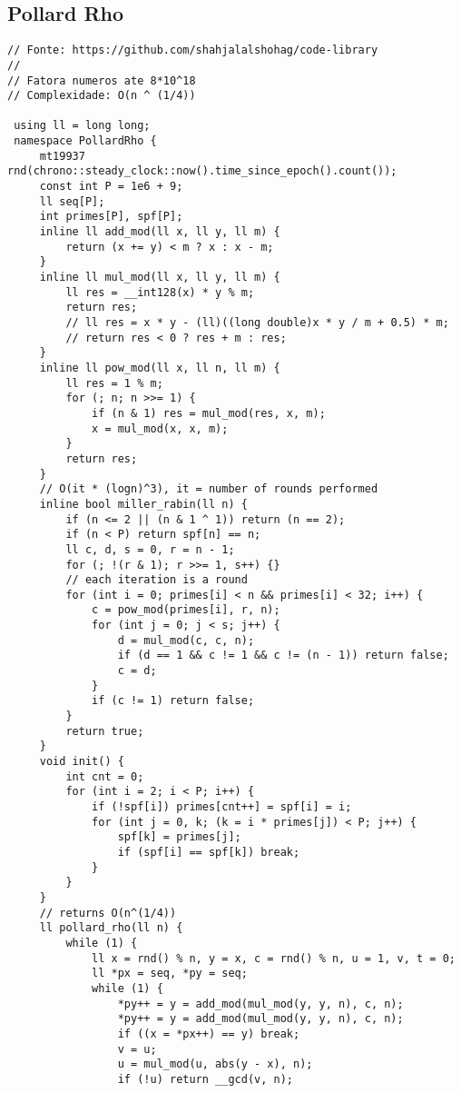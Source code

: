 \documentclass[11pt, a4paper, twoside]{article}
\begin{document}
\subsection{Pollard Rho}
\begin{lstlisting}
// Fonte: https://github.com/shahjalalshohag/code-library
// 
// Fatora numeros ate 8*10^18 
// Complexidade: O(n ^ (1/4))

 using ll = long long;
 namespace PollardRho {
     mt19937 rnd(chrono::steady_clock::now().time_since_epoch().count());
     const int P = 1e6 + 9;
     ll seq[P];
     int primes[P], spf[P];
     inline ll add_mod(ll x, ll y, ll m) {
         return (x += y) < m ? x : x - m;
     }
     inline ll mul_mod(ll x, ll y, ll m) {
         ll res = __int128(x) * y % m;
         return res;
         // ll res = x * y - (ll)((long double)x * y / m + 0.5) * m;
         // return res < 0 ? res + m : res;
     }
     inline ll pow_mod(ll x, ll n, ll m) {
         ll res = 1 % m;
         for (; n; n >>= 1) {
             if (n & 1) res = mul_mod(res, x, m);
             x = mul_mod(x, x, m);
         }
         return res;
     }
     // O(it * (logn)^3), it = number of rounds performed
     inline bool miller_rabin(ll n) {
         if (n <= 2 || (n & 1 ^ 1)) return (n == 2);
         if (n < P) return spf[n] == n;
         ll c, d, s = 0, r = n - 1;
         for (; !(r & 1); r >>= 1, s++) {}
         // each iteration is a round
         for (int i = 0; primes[i] < n && primes[i] < 32; i++) {
             c = pow_mod(primes[i], r, n);
             for (int j = 0; j < s; j++) {
                 d = mul_mod(c, c, n);
                 if (d == 1 && c != 1 && c != (n - 1)) return false;
                 c = d;
             }
             if (c != 1) return false;
         }
         return true;
     }
     void init() {
         int cnt = 0;
         for (int i = 2; i < P; i++) {
             if (!spf[i]) primes[cnt++] = spf[i] = i;
             for (int j = 0, k; (k = i * primes[j]) < P; j++) {
                 spf[k] = primes[j];
                 if (spf[i] == spf[k]) break;
             }
         }
     }
     // returns O(n^(1/4))
     ll pollard_rho(ll n) {
         while (1) {
             ll x = rnd() % n, y = x, c = rnd() % n, u = 1, v, t = 0;
             ll *px = seq, *py = seq;
             while (1) {
                 *py++ = y = add_mod(mul_mod(y, y, n), c, n);
                 *py++ = y = add_mod(mul_mod(y, y, n), c, n);
                 if ((x = *px++) == y) break;
                 v = u;
                 u = mul_mod(u, abs(y - x), n);
                 if (!u) return __gcd(v, n);

\end{lstlisting}
\end{document}
